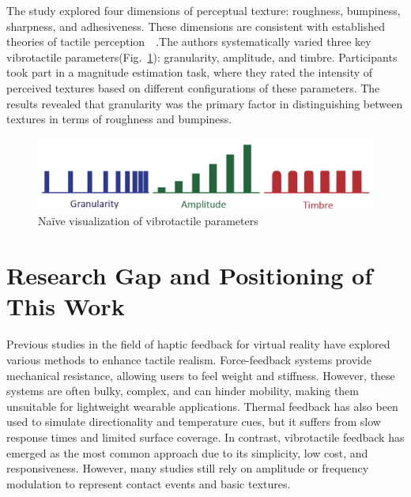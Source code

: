 The study explored four dimensions of perceptual texture: roughness, bumpiness, sharpness, and adhesiveness. These dimensions are consistent with established theories of tactile perception~~\cite{6216375}.The authors systematically varied three key vibrotactile parameters(Fig.~\ref{fig:Texture_Rendering_2}): granularity, amplitude, and timbre. Participants took part in a magnitude estimation task, where they rated the intensity of perceived textures based on different configurations of these parameters. The results revealed that granularity was the primary factor in distinguishing between textures in terms of roughness and bumpiness.

\begin{figure}[H]\centering
	\includegraphics[width=1\textwidth]{Pictures/Texture_Rendering_2.png}%
	\caption{Naïve visualization of vibrotactile parameters~\cite{10.1145/3025453.3025812}}\label{fig:Texture_Rendering_2}%
\end{figure}


\section{Research Gap and Positioning of This Work}
Previous studies in the field of haptic feedback for virtual reality have explored various methods to enhance tactile realism. Force-feedback systems provide mechanical resistance, allowing users to feel weight and stiffness. However, these systems are often bulky, complex, and can hinder mobility, making them unsuitable for lightweight wearable applications. Thermal feedback has also been used to simulate directionality and temperature cues, but it suffers from slow response times and limited surface coverage. In contrast, vibrotactile feedback has emerged as the most common approach due to its simplicity, low cost, and responsiveness. However, many studies still rely on amplitude or frequency modulation to represent contact events and basic textures.

